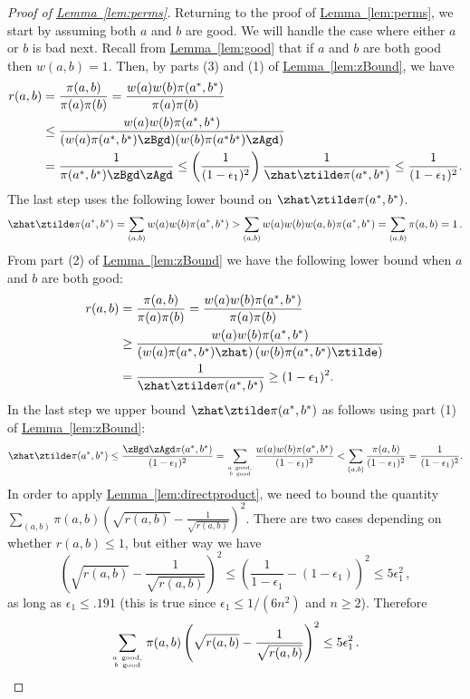 \documentclass[11pt]{article}
\providecommand{\expref}[2]{\texorpdfstring{\hyperref[#2]{#1~\ref{#2}}}{#1~\ref{#2}}}
\begin{document}
\begin{proof}[Proof of \expref{Lemma}{lem:perms}]
Returning to the proof of \expref{Lemma}{lem:perms}, we start by assuming 
both $a$ and $b$ are good.  We will handle the case where either $a$ or $b$ is bad next.  
Recall from \expref{Lemma}{lem:good} that if $a$ and $b$ are both good then $w(a,b) = 1$.  Then, by parts (3) and 
(1) of \expref{Lemma}{lem:zBound}, we have
\begin{align*}
  r(a,b)&=\frac{\pi(a,b)}{\pi(a)\pi(b)}=\frac{w(a)w(b)\pi(a^*,b^*)}{\pi(a)\pi(b)}\\
  &\leq \frac{w(a)w(b)\pi(a^*,b^*)}{(w(a)\pi(a^*,b^*)\zBgd)(w(b) \pi(a^*b^*)\zAgd)}\\
  &= \frac{1}{\pi(a^*,b^*)\zBgd\zAgd}\leq \left(\frac{1}{(1-\epsilon_1)^2}\right) \frac{1}{\zhat\ztilde \pi(a^*,b^*)} \leq \frac{1}{(1-\epsilon_1)^2}.
\end{align*}
The last step uses the following lower bound on $\zhat\ztilde\pi(a^*,b^*)$.
 $$\zhat\ztilde\pi(a^*,b^*) =\sum_{(a,b)} w(a)w(b) \pi(a^*,b^*) > \sum_{(a,b)} w(a)w(b) w(a,b)\pi(a^*,b^*)  = \sum_{(a,b)} \pi(a,b) = 1\,.$$
From part (2) of \expref{Lemma}{lem:zBound} we have the following lower 
bound when $a$ and $b$ are both good:
\begin{align*}
  r(a,b)&=\frac{\pi(a,b)}{\pi(a)\pi(b)}=\frac{w(a)w(b)\pi(a^*,b^*)}{\pi(a)\pi(b)}\\
  &\geq \frac{w(a)w(b)\pi(a^*,b^*)}{
     \left(w(a)\pi(a^*,b^*)\zhat\right)\left(w(b)\pi(a^*,b^*)\ztilde\right)}\\
  &= \frac{1}{
     \zhat\ztilde\pi(a^*,b^*)} \geq(1-\epsilon_1)^2.
\end{align*}
In the last step we upper bound $\zhat\ztilde\pi(a^*,b^*)$ as follows 
using part (1) of \expref{Lemma}{lem:zBound}:
\begin{equation*}\label{prodBound}
\zhat\ztilde\pi(a^*,b^*) \leq\frac{\zBgd\zAgd\pi(a^*,b^*)}{ (1-\epsilon_1)^{2}}= \sum_{a~\text{good},\atop b~\text{good}} \frac{w(a)w(b) \pi(a^*,b^*)}{(1-\epsilon_1)^{2}}< \sum_{(a,b)}\frac{ \pi(a,b)}{(1-\epsilon_1)^{2}} = \frac{1}{(1-\epsilon_1)^{2}}.
\end{equation*}
In order to apply \expref{Lemma}{lem:directproduct}, we need to bound the 
quantity $\sum_{(a,b)}\pi(a,b)\left(\sqrt{r(a,b)}-\frac{1}{\sqrt{r(a,b)}}\right)^2$.  
There are two cases depending on whether $r(a,b)\leq 1$, but either
way we have
\[\left(\sqrt{r(a,b)}-\frac{1}{\sqrt{r(a,b)}}\right)^2\leq
  \left(\frac{1}{1-\epsilon_1} - (1-\epsilon_1)\right)^2\leq
  5\epsilon_1^2\,,\]
as long as $\epsilon_1\leq .191$ (this is true since $\epsilon_1\leq 
1/(6n^2)$ and $n\geq 2$).  Therefore
  \[\sum_{a~\text{good},\atop
    b~\text{good}}\pi(a,b)\left(\sqrt{r(a,b)}-\frac{1}{\sqrt{r(a,b)}}\right)^2\leq
  5\epsilon_1^2\,.\]
  

\end{proof}
\end{document}
